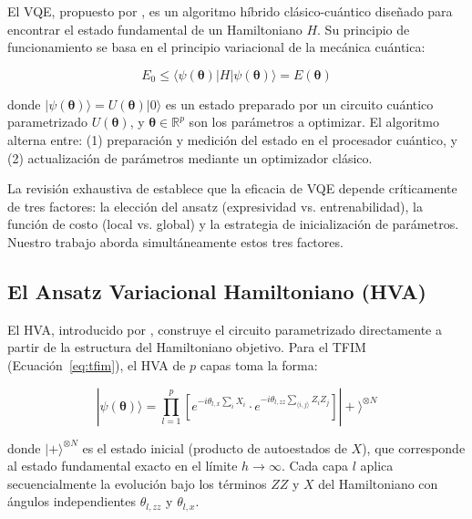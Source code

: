 \documentclass[11pt,a4paper,spanish]{book}
\begin{document}
El VQE, propuesto por \citet{peruzzo2014}, es un algoritmo híbrido clásico-cuántico diseñado para encontrar el estado fundamental de un Hamiltoniano $H$. Su principio de funcionamiento se basa en el principio variacional de la mecánica cuántica:

\begin{equation}
E_0 \leq \langle \psi(\boldsymbol{\theta}) | H | \psi(\boldsymbol{\theta}) \rangle = E(\boldsymbol{\theta})
\label{eq:variational}
\end{equation}

\noindent donde $|\psi(\boldsymbol{\theta})\rangle = U(\boldsymbol{\theta})|0\rangle$ es un estado preparado por un circuito cuántico parametrizado $U(\boldsymbol{\theta})$, y $\boldsymbol{\theta} \in \mathbb{R}^p$ son los parámetros a optimizar. El algoritmo alterna entre: (1) preparación y medición del estado en el procesador cuántico, y (2) actualización de parámetros mediante un optimizador clásico.

La revisión exhaustiva de \citet{tilly2022} establece que la eficacia de VQE depende críticamente de tres factores: la elección del ansatz (expresividad vs. entrenabilidad), la función de costo (local vs. global) y la estrategia de inicialización de parámetros. Nuestro trabajo aborda simultáneamente estos tres factores.

\subsection{El Ansatz Variacional Hamiltoniano (HVA)}

El HVA, introducido por \citet{wiersema2020}, construye el circuito parametrizado directamente a partir de la estructura del Hamiltoniano objetivo. Para el TFIM (Ecuación~\ref{eq:tfim}), el HVA de $p$ capas toma la forma:

\begin{equation}
|\psi(\boldsymbol{\theta})\rangle = \prod_{l=1}^{p} \left[ e^{-i\theta_{l,x} \sum_i X_i} \cdot e^{-i\theta_{l,zz} \sum_{\langle i,j \rangle} Z_i Z_j} \right] |+\rangle^{\otimes N}
\label{eq:hva}
\end{equation}

\noindent donde $|+\rangle^{\otimes N}$ es el estado inicial (producto de autoestados de $X$), que corresponde al estado fundamental exacto en el límite $h \to \infty$. Cada capa $l$ aplica secuencialmente la evolución bajo los términos $ZZ$ y $X$ del Hamiltoniano con ángulos independientes $\theta_{l,zz}$ y $\theta_{l,x}$.
\end{document}
